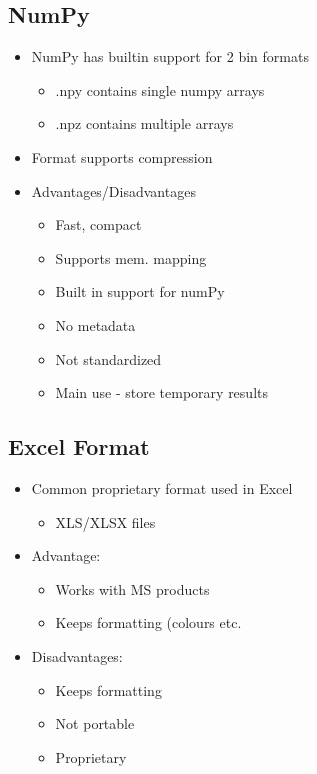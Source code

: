 \documentclass[a4paper]{article}
\begin{document}
\subsection{NumPy}
\begin{itemize}
	\item NumPy has builtin support for 2 bin formats
	\begin{itemize}
		\item .npy contains single numpy arrays
		\item .npz contains multiple arrays
	\end{itemize}
	\item Format supports compression
	\item Advantages/Disadvantages
	\begin{itemize}
		\item Fast, compact
		\item Supports mem. mapping
		\item Built in support for numPy
		\item No metadata
		\item Not standardized
		\item Main use - store temporary results
	\end{itemize}
\end{itemize}
\subsection{Excel Format}
\begin{itemize}
	\item Common proprietary format used in Excel
	\begin{itemize}
		\item XLS/XLSX files
	\end{itemize}
	\item Advantage:
	\begin{itemize}
		\item Works with MS products
		\item Keeps formatting (colours etc.
	\end{itemize}
	\item Disadvantages:
	\begin{itemize}
		\item Keeps formatting
		\item Not portable
		\item Proprietary
	\end{itemize}
\end{itemize}
\end{document}
